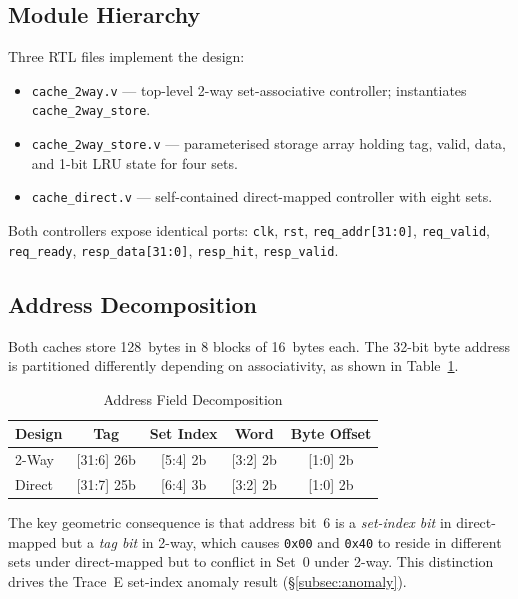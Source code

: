 \documentclass[conference]{IEEEtran}
\begin{document}
\subsection{Module Hierarchy}
\label{subsec:hierarchy}

Three RTL files implement the design:

\begin{itemize}
  \item {\tt cache\_2way.v} — top-level 2-way set-associative controller;
        instantiates {\tt cache\_2way\_store}.
  \item {\tt cache\_2way\_store.v} — parameterised storage array holding
        tag, valid, data, and 1-bit LRU state for four sets.
  \item {\tt cache\_direct.v} — self-contained direct-mapped controller
        with eight sets.
\end{itemize}

Both controllers expose identical ports: {\tt clk}, {\tt rst},
{\tt req\_addr[31:0]}, {\tt req\_valid}, {\tt req\_ready},
{\tt resp\_data[31:0]}, {\tt resp\_hit}, {\tt resp\_valid}.

\subsection{Address Decomposition}
\label{subsec:addr}

Both caches store 128~bytes in 8 blocks of 16~bytes each.
The 32-bit byte address is partitioned differently depending on associativity,
as shown in Table~\ref{tab:addr}.

\begin{table}[h]
  \caption{Address Field Decomposition}
  \label{tab:addr}
  \centering
  \small
  \begin{tabular}{lcccc}
    \toprule
    Design & Tag & Set Index & Word & Byte Offset \\
    \midrule
    2-Way  & {[}31:6{]} 26b & {[}5:4{]} 2b & {[}3:2{]} 2b & {[}1:0{]} 2b \\
    Direct & {[}31:7{]} 25b & {[}6:4{]} 3b & {[}3:2{]} 2b & {[}1:0{]} 2b \\
    \bottomrule
  \end{tabular}
\end{table}

The key geometric consequence is that address bit~6 is a \emph{set-index
bit} in direct-mapped but a \emph{tag bit} in 2-way, which causes
{\tt 0x00} and {\tt 0x40} to reside in different sets under direct-mapped
but to conflict in Set~0 under 2-way. This distinction drives the Trace~E
set-index anomaly result (\S\ref{subsec:anomaly}).
\end{document}
